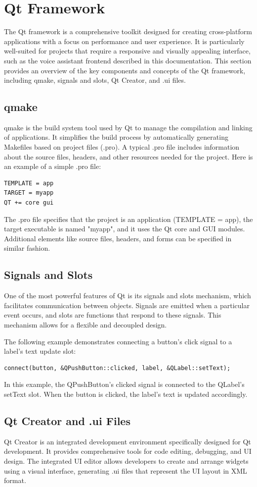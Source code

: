 \section{Qt Framework}
The Qt framework is a comprehensive toolkit designed for creating cross-platform applications
with a focus on performance and user experience.
It is particularly well-suited for projects that require a responsive and visually appealing interface,
such as the voice assistant frontend described in this documentation.
This section provides an overview of the key components and concepts of the Qt framework,
including qmake, signals and slots, Qt Creator, and .ui files.

\subsection{qmake}
qmake is the build system tool used by Qt to manage the compilation and linking of applications.
It simplifies the build process by automatically generating Makefiles based on project files (.pro).
A typical .pro file includes information about the source files, headers,
and other resources needed for the project. Here is an example of a simple .pro file:

\begin{verbatim}
TEMPLATE = app
TARGET = myapp
QT += core gui
\end{verbatim}

The .pro file specifies that the project is an application (TEMPLATE = app),
the target executable is named "myapp", and it uses the Qt core and GUI modules.
Additional elements like source files, headers, and forms can be specified in similar fashion.

\subsection{Signals and Slots}
One of the most powerful features of Qt is its signals and slots mechanism,
which facilitates communication between objects.
Signals are emitted when a particular event occurs,
and slots are functions that respond to these signals.
This mechanism allows for a flexible and decoupled design.

The following example demonstrates connecting a button's click signal to a label's text update slot:

\begin{verbatim}
connect(button, &QPushButton::clicked, label, &QLabel::setText);
\end{verbatim}

In this example, the QPushButton's clicked signal is connected to the QLabel's setText slot.
When the button is clicked, the label's text is updated accordingly.

\subsection{Qt Creator and .ui Files}
Qt Creator is an integrated development environment specifically designed for Qt development.
It provides comprehensive tools for code editing, debugging, and UI design.
The integrated UI editor allows developers to create and arrange widgets using a visual interface,
generating .ui files that represent the UI layout in XML format.
